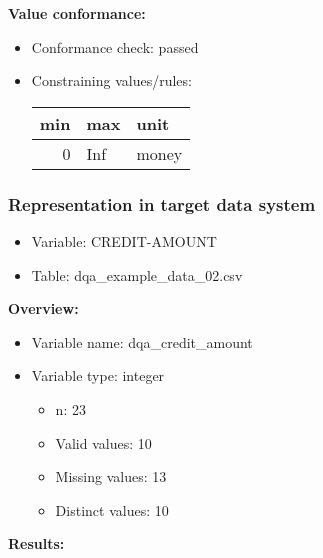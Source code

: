 \documentclass[
]{article}
\providecommand{\tightlist}{%
  \setlength{\itemsep}{0pt}\setlength{\parskip}{0pt}}
\begin{document}
\textbf{Value conformance:}

\begin{itemize}
\tightlist
\item
  Conformance check: passed
\item
  Constraining values/rules:

  \begin{table}[H]
  \centering
  \begin{tabular}{r|l|l}
  \hline
  \textbf{min} & \textbf{max} & \textbf{unit}\\
  \hline
  0 & Inf & money\\
  \hline
  \end{tabular}
  \end{table}
\end{itemize}

\newpage

\hypertarget{representation-in-target-data-system-1}{%
\subsubsection{\texorpdfstring{Representation in \textbf{target} data
system}{Representation in target data system}}\label{representation-in-target-data-system-1}}

\begin{itemize}
\tightlist
\item
  Variable: CREDIT-AMOUNT
\item
  Table: dqa\_example\_data\_02.csv
\end{itemize}

\textbf{Overview:}

\begin{itemize}
\tightlist
\item
  Variable name: dqa\_credit\_amount
\item
  Variable type: integer

  \begin{itemize}
  \tightlist
  \item
    n: 23
  \item
    Valid values: 10
  \item
    Missing values: 13
  \item
    Distinct values: 10
  \end{itemize}
\end{itemize}

\textbf{Results:}\\
\end{document}
